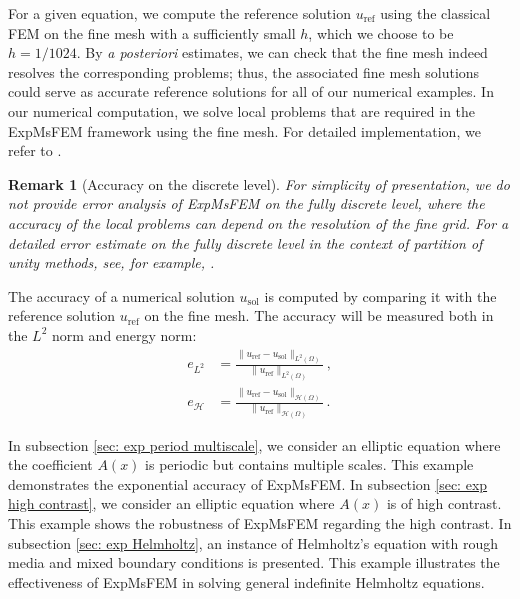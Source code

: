 \documentclass[12pt]{caltech_thesis}
\newtheorem{remark}[theorem]{Remark}
\numberwithin{equation}{section}
\begin{document}
For a given equation,  we compute the reference solution $u_{\text{ref}}$ using the classical FEM on the fine mesh with a sufficiently small $h$, which we choose to be $h=1/1024$. By \textit{a posteriori} estimates, we can check that the fine mesh indeed resolves the corresponding problems; thus, the associated fine mesh solutions could serve as accurate reference solutions for all of our numerical examples. In our numerical computation, we solve local problems that are required in the ExpMsFEM framework using the fine mesh. For detailed implementation, we refer to \cite{chen2021exponential,chen2023exponentially}.
 \begin{remark}[Accuracy on the discrete level]
For simplicity of presentation, we do not provide error analysis of ExpMsFEM on the fully discrete level, where the accuracy of the local problems can depend on the resolution of the fine grid. For a detailed error estimate on the fully discrete level in the context of partition of unity methods, see, for example, \cite{ma2021error, ma2021wavenumber}.
\end{remark}
The accuracy of a numerical solution $u_{\mathrm{sol}}$ is computed by comparing it with the reference solution $u_{\text{ref}}$ on the fine mesh. The accuracy will be measured both in the $L^2$ norm and energy norm: 
    \begin{equation}
\label{rel_error}
\begin{aligned}
e_{L^{2}}&=\frac{\|u_{\text{ref}}-u_{\mathrm{sol}}\|_{L^{2}(\Omega)}}{\|u_{\text{ref}}\|_{L^{2}(\Omega)}}\, ,\\
e_{\mathcal{H}}&=\frac{\|u_{\text{ref}}-u_{\mathrm{sol}}\|_{\mathcal{H}(\Omega)}}{\|u_{\text{ref}}\|_{\mathcal{H}(\Omega)}}\, . 
\end{aligned}
\end{equation}

In subsection \ref{sec: exp period multiscale}, we consider an elliptic equation where the coefficient $A(x)$ is periodic but contains multiple scales. This example demonstrates the exponential accuracy of ExpMsFEM. In subsection \ref{sec: exp high contrast}, we consider an elliptic equation where $A(x)$ is of high contrast. This example shows the robustness of ExpMsFEM regarding the high contrast. In subsection \ref{sec: exp Helmholtz}, an instance of Helmholtz's equation with rough media and mixed boundary conditions is presented. This example illustrates the effectiveness of ExpMsFEM in solving general indefinite Helmholtz equations.
\end{document}

